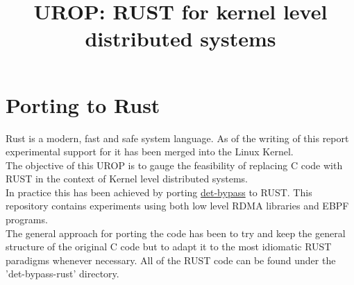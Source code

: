 \documentclass{article}
\title{UROP: RUST for kernel level distributed systems}
\author{}
\date{}
\begin{document}
\maketitle

\section*{Porting to Rust}
Rust is a modern, fast and safe system language. As of the writing of this report experimental support for it has been merged into the Linux Kernel.\\
The objective of this UROP is to gauge the feasibility of replacing C code with RUST in the context of Kernel level distributed systems. \\
In practice this has been achieved by porting \href{https://github.com/swystems/det-bypass}{det-bypass} to RUST. This repository contains experiments using both low level RDMA libraries and EBPF programs.\\
The general approach for porting the code has been to try and keep the general structure of the original C code but to adapt it to the most idiomatic RUST paradigms whenever necessary. All of the RUST code can be found under the 'det-bypass-rust' directory.
\end{document}
